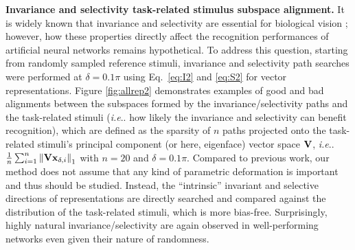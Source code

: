 \documentclass[fleqn]{article} %
\makeatletter
\DeclareRobustCommand\onedot{\futurelet\@let@token\@onedot}
\def\@onedot{\ifx\@let@token.\else.\null\fi\xspace}
\def\ie{\emph{i.e}\onedot} \def\Ie{\emph{I.e}\onedot}
\makeatother
\begin{document}
{\bf Invariance and selectivity \vs task-related stimulus subspace alignment.} 
It is widely known that invariance and selectivity are essential for biological vision \cite{desimone1991face, ito1995size}; however, how these properties directly affect the recognition performances of artificial neural networks remains hypothetical.
To address this question, starting from randomly sampled reference stimuli, invariance and selectivity path searches {were} performed at $\delta = 0.1\pi$ using Eq.~\ref{eq:I2} and \ref{eq:S2} for vector representations. 
Figure \ref{fig:allrep2} demonstrates examples of good and bad alignments between the subspaces formed by the invariance/selectivity paths and the task-related stimuli (\ie how likely the invariance and selectivity can benefit recognition), which are defined as the sparsity of $n$ paths projected onto the task-related stimuli's principal component (or here, eigenface) vector space $\bf{V}$, \ie $\frac{1}{n}\sum_{i=1}^{n} \left\| {\bf{Vx}}_{\delta,i} \right\|_{1}$ with $n=20$ and $\delta=0.1\pi$.
Compared to previous work, our method does not assume that any kind of parametric deformation is important and thus should be studied.
Instead, the ``intrinsic'' invariant and selective directions of representations are directly searched and compared against the distribution of the task-related stimuli, which is more bias-free.
Surprisingly, highly natural invariance/selectivity are again observed in well-performing networks even given their nature of randomness.

\end{document}
